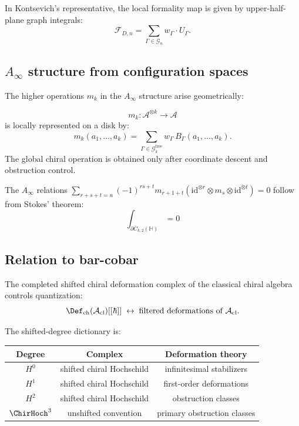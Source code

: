In Kontsevich's representative, the local formality map is given by
upper-half-plane graph integrals:
\[\mathcal{F}_{D,n} = \sum_{\Gamma \in \mathcal{G}_n} w_\Gamma \cdot U_\Gamma.\]

\subsection{\texorpdfstring{$A_\infty$ structure from configuration spaces}{A- structure from configuration spaces}}

The higher operations $m_k$ in the $A_\infty$ structure arise geometrically:

\begin{proposition}
\label{prop:ainfty-operations-config}
\[m_k: \mathcal{A}^{\otimes k} \to \mathcal{A}\]
is locally represented on a disk by:
\[
m_k(a_1,\ldots,a_k)=
\sum_{\Gamma\in\mathcal G_k^{\mathrm{tree}}}
w_\Gamma\,B_\Gamma(a_1,\ldots,a_k).
\]
The global chiral operation is obtained only after coordinate descent
and obstruction control.
\end{proposition}

The $A_\infty$ relations $\sum_{r+s+t=n} (-1)^{rs+t} m_{r+1+t}(\mathrm{id}^{\otimes r} \otimes m_s \otimes \mathrm{id}^{\otimes t}) = 0$ follow from Stokes' theorem:
\[\int_{\partial \overline{C}_{k,2}(\mathbb H)} = 0\]

\subsection{Relation to bar-cobar}

\begin{theorem}\label{thm:master-identity-deformation}
The completed shifted chiral deformation complex of the classical
chiral algebra controls quantization:
\[
\Def_{\mathrm{ch}}(\mathcal{A}_{\mathrm{cl}})[[\hbar]]
\;\leftrightarrow\;
\text{filtered deformations of } \mathcal{A}_{\mathrm{cl}}.
\]

The shifted-degree dictionary is:
\begin{center}
\begin{tabular}{|c|c|c|}
\hline
Degree & Complex & Deformation theory \\
\hline
$H^0$ & shifted chiral Hochschild & infinitesimal stabilizers \\
$H^1$ & shifted chiral Hochschild & first-order deformations \\
$H^2$ & shifted chiral Hochschild & obstruction classes \\
$\ChirHoch^3$ & unshifted convention & primary obstruction classes \\
\hline
\end{tabular}
\end{center}
\end{theorem}

